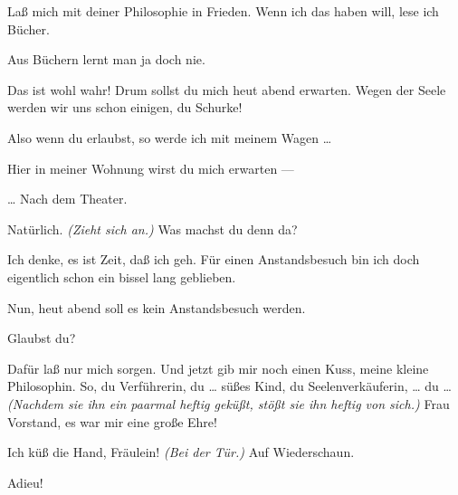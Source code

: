 \documentclass[
	final,
	a4paper,
	ngerman,
	mpinclude = true, %
	twoside = true,
	open = right,
	cleardoublepage = plain,
	DIV = 13,
	BCOR = 1cm,
	titlepage = firstiscover,
	]{scrbook}
\newcommand{\direction}[1]{\textit{(#1)}}
\newcommand{\thecharacter}[1]{\textup{\textsc{#1}}\xspace}
\newcommand{\theschauspielerin}{\thecharacter{Daniela}}
\newcommand{\theentrepeneurin}{\thecharacter{Katerina Albrecht}}
\newcommand{\character}[1]{\item[#1:]}
\newcommand{\schauspielerin}{\character{\theschauspielerin}}
\newcommand{\entrepeneurin}{\character{\theentrepeneurin}}
\begin{document}
\begin{play}
	\schauspielerin
	Laß mich mit deiner Philosophie in Frieden. Wenn ich das haben will, lese ich Bücher.

	\entrepeneurin
	Aus Büchern lernt man ja doch nie.

	\schauspielerin
	Das ist wohl wahr! Drum sollst du mich heut abend erwarten. Wegen der Seele werden wir uns schon einigen, du Schurke!

	\entrepeneurin
	Also wenn du erlaubst, so werde ich mit meinem Wagen \ldots{}

	\schauspielerin
	Hier in meiner Wohnung wirst du mich erwarten ---

	\entrepeneurin
	\ldots{} Nach dem Theater.

	\schauspielerin
	Natürlich. \direction{Zieht sich an.} Was machst du denn da?

	\entrepeneurin
	Ich denke, es ist Zeit, daß ich geh. Für einen Anstandsbesuch bin ich doch eigentlich schon ein bissel lang geblieben.

	\schauspielerin
	Nun, heut abend soll es kein Anstandsbesuch werden.

	\entrepeneurin
	Glaubst du?

	\schauspielerin
	Dafür laß nur mich sorgen. Und jetzt gib mir noch einen Kuss, meine kleine Philosophin. So, du Verführerin, du \ldots{} süßes Kind, du Seelenverkäuferin, \ldots{} du \ldots{} \direction{Nachdem sie ihn ein paarmal heftig geküßt, stößt sie ihn heftig von sich.} Frau Vorstand, es war mir eine große Ehre!

	\entrepeneurin
	Ich küß die Hand, Fräulein! \direction{Bei der Tür.} Auf Wiederschaun.

	\schauspielerin
	Adieu!

\end{play}
\end{document}
